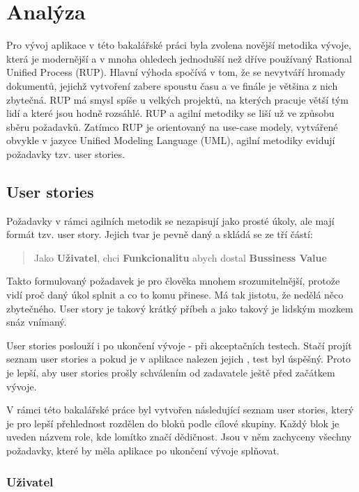 \chapter{Analýza}

Pro vývoj aplikace v této bakalářské práci byla zvolena novější metodika vývoje, která je modernější a v mnoha ohledech jednodušší než dříve používaný Rational Unified Process (RUP)\cite{rup}. Hlavní výhoda spočívá v tom, že se nevytváří hromady dokumentů, jejichž vytvoření zabere spoustu času a ve finále je většina z nich zbytečná. RUP má smysl spíše u velkých projektů, na kterých pracuje větší tým lidí a které jsou hodně rozsáhlé. RUP a agilní metodiky se liší už ve způsobu sběru požadavků. Zatímco RUP je orientovaný na use-case modely, vytvářené obvykle v jazyce Unified Modeling Language (UML)\cite{uml}, agilní metodiky evidují požadavky tzv. user stories\cite{userstory}.

\section{User stories}

Požadavky v rámci agilních metodik se nezapisují jako prosté úkoly, ale mají formát tzv. user story. Jejich tvar je pevně daný a skládá se ze tří částí:
\begin{quote}
Jako \textbf{Uživatel}, chci \textbf{Funkcionalitu} abych dostal \textbf{Bussiness Value}
\end{quote}

Takto formulovaný požadavek je pro člověka mnohem srozumitelnější, protože vidí proč daný úkol splnit a co to komu přinese. Má tak jistotu, že nedělá něco zbytečného. User story\cite{userstory} je takový krátký příbeh a jako takový je lidským mozkem snáz vnímaný.

User stories poslouží i po ukončení vývoje - při akceptačních testech. Stačí projít seznam user stories a pokud je v aplikace nalezen jejich , test byl úspěšný. Proto je lepší, aby user stories prošly schválením od zadavatele ještě před začátkem vývoje.

V rámci této bakalářské práce byl vytvořen následující seznam user stories, který je pro lepší přehlednost rozdělen do bloků podle cílové skupiny. Každý blok je uveden názvem role, kde lomítko značí dědičnost. Jsou v něm zachyceny všechny požadavky, které by měla aplikace po ukončení vývoje splňovat.

\subsection{Uživatel}


